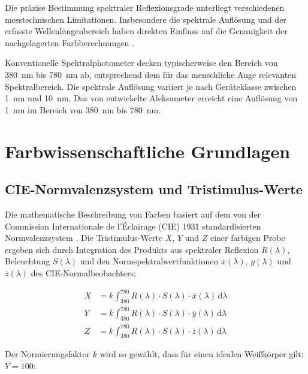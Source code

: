 Die präzise Bestimmung spektraler Reflexionsgrade unterliegt verschiedenen messtechnischen Limitationen. Insbesondere die spektrale Auflösung und der erfasste Wellenlängenbereich haben direkten Einfluss auf die Genauigkeit der nachgelagerten Farbberechnungen \parencite{Schanda2007}.

Konventionelle Spektralphotometer decken typischerweise den Bereich von \SI{380}{\nano\meter} bis \SI{780}{\nano\meter} ab, entsprechend dem für das menschliche Auge relevanten Spektralbereich. Die spektrale Auflösung variiert je nach Geräteklasse zwischen \SI{1}{\nano\meter} und \SI{10}{\nano\meter}. Das von \textcite{Piotrowska2022} entwickelte Aleksameter erreicht eine Auflösung von \SI{1}{\nano\meter} im Bereich von \SI{380}{\nano\meter} bis \SI{780}{\nano\meter}.

\section{Farbwissenschaftliche Grundlagen}

\subsection{CIE-Normvalenzsystem und Tristimulus-Werte}

Die mathematische Beschreibung von Farben basiert auf dem von der Commission Internationale de l'Éclairage (CIE) 1931 standardisierten Normvalenzsystem \parencite{CIE015}. Die Tristimulus-Werte $X$, $Y$ und $Z$ einer farbigen Probe ergeben sich durch Integration des Produkts aus spektraler Reflexion $R(\lambda)$, Beleuchtung $S(\lambda)$ und den Normspektralwertfunktionen $\overline{x}(\lambda)$, $\overline{y}(\lambda)$ und $\overline{z}(\lambda)$ des CIE-Normalbeobachters:

\begin{align}
X &= k \int_{380}^{780} R(\lambda) \cdot S(\lambda) \cdot \overline{x}(\lambda) \, \mathrm{d}\lambda \label{eq:tristimulus_x}\\
Y &= k \int_{380}^{780} R(\lambda) \cdot S(\lambda) \cdot \overline{y}(\lambda) \, \mathrm{d}\lambda \label{eq:tristimulus_y}\\
Z &= k \int_{380}^{780} R(\lambda) \cdot S(\lambda) \cdot \overline{z}(\lambda) \, \mathrm{d}\lambda \label{eq:tristimulus_z}
\end{align}

Der Normierungsfaktor $k$ wird so gewählt, dass für einen idealen Weißkörper gilt: $Y = 100$:

